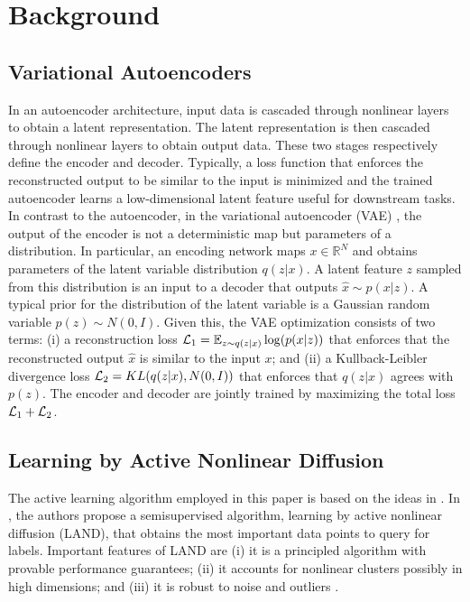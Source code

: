 \documentclass{article}
\def\R{\mathbb{R}}
\def\L{{\cal L}}
\def\L{{\cal L}}
\def\R{{\mathbb R}}
\def\E{{\mathbb E}}
\begin{document}

\section{Background}
\label{sec:vaes}


\subsection{Variational Autoencoders}
\label{subsec:vaes}


In an autoencoder architecture, input data is cascaded through nonlinear layers to obtain a latent representation. The latent representation is then cascaded  through nonlinear layers to obtain output data. These two stages respectively define the encoder and decoder. Typically, a loss function that enforces the reconstructed output to be similar to the input is minimized and the trained autoencoder learns
a low-dimensional latent feature useful for downstream tasks. In contrast to the autoencoder, in the variational autoencoder (VAE) \cite{kingma2014auto}, the output of the encoder is not a deterministic map but parameters of a distribution.  In particular, an encoding network maps $x \in \R^N$ and obtains parameters of the latent variable distribution $q(z|x)$. A latent feature $z$  sampled from this distribution is an input to a decoder that outputs $\hat{x}\sim p(x|z)$. A typical prior for the distribution of the latent variable is a Gaussian random variable $p(z)\sim N(0,I)$. Given this, the VAE optimization consists of two terms: (i) a reconstruction loss $\L_1=  \E_{z \sim q(z|x)} \log(p(x|z))$ that enforces that the reconstructed output $\hat{x}$ is similar to the input $x$; and (ii) a Kullback-Leibler divergence loss $\L_2 =  KL(q(z|x),N(0,I))$  that enforces that $q(z|x)$ agrees with $p(z)$. The encoder and decoder are jointly trained by maximizing the total loss $\L_1+\L_2$. 

\subsection{Learning by Active Nonlinear Diffusion}



The active learning algorithm employed in this paper is based on the ideas in \cite{Murphy2019_Unsupervised, Maggioni2019_LUND, Murphy2020_Spectral}.  In \cite{Maggioni2019_LAND}, the authors propose a semisupervised algorithm, learning by active nonlinear diffusion (LAND), that obtains the most important data points to query  for labels.  Important features of LAND are (i) it is a principled algorithm with provable performance guarantees; (ii) it accounts for nonlinear clusters possibly in high dimensions; and (iii) it is robust to noise and outliers \cite{Maggioni2019_LAND}.
\end{document}
